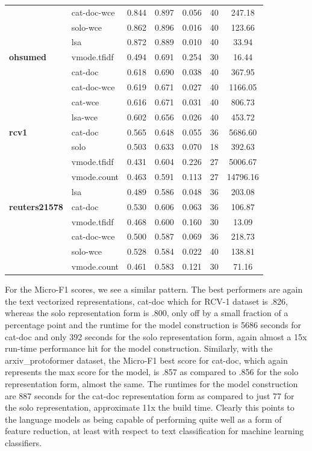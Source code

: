 \documentclass[final]{clv2025}
\begin{document}
\begin{table}[h!]
\begin{tabular}{@{}p{2.2cm} p{2.6cm} c c c c c@{}}
 & cat-doc-wce & 0.844 & 0.897 & 0.056 & 40 & 247.18 \\
 & solo-wce & 0.862 & 0.896 & 0.016 & 40 & 123.66 \\
 & lsa & 0.872 & 0.889 & 0.010 & 40 & 33.94 \\
\midrule
\textbf{ohsumed} & vmode.tfidf & 0.494 & 0.691 & 0.254 & 30 & 16.44 \\
 & cat-doc & 0.618 & 0.690 & 0.038 & 40 & 367.95 \\
 & cat-doc-wce & 0.619 & 0.671 & 0.027 & 40 & 1166.05 \\
 & cat-wce & 0.616 & 0.671 & 0.031 & 40 & 806.73 \\
 & lsa-wce & 0.602 & 0.656 & 0.026 & 40 & 453.72 \\
\midrule
\textbf{rcv1} & cat-doc & 0.565 & 0.648 & 0.055 & 36 & 5686.60 \\
 & solo & 0.503 & 0.633 & 0.070 & 18 & 392.63 \\
 & vmode.tfidf & 0.431 & 0.604 & 0.226 & 27 & 5006.67 \\
 & vmode.count & 0.463 & 0.591 & 0.113 & 27 & 14796.16 \\
 & lsa & 0.489 & 0.586 & 0.048 & 36 & 203.08 \\
\midrule
\textbf{reuters21578} & cat-doc & 0.530 & 0.606 & 0.063 & 36 & 106.87 \\
 & vmode.tfidf & 0.468 & 0.600 & 0.160 & 30 & 13.09 \\
 & cat-doc-wce & 0.500 & 0.587 & 0.069 & 36 & 218.73 \\
 & solo-wce & 0.528 & 0.584 & 0.022 & 40 & 138.81 \\
 & vmode.count & 0.461 & 0.583 & 0.121 & 30 & 71.16 \\
\bottomrule
\end{tabular}
\end{table}

For the Micro-F1 scores, we see a similar pattern. The best performers are again the text vectorized representations, cat-doc which for RCV-1 dataset is .826, whereas the solo representation form is .800, only off by a small fraction of a percentage point and the runtime for the model construction is 5686 seconds for cat-doc and only 392 seconds for the solo representation form, again almost a 15x run-time performance hit for the model construction. Similarly, with the arxiv\_protoformer dataset, the Micro-F1 best score for cat-doc, which again represents the max score for the model, is .857 as compared to .856 for the solo representation form, almost the same. The runtimes for the model construction are 887 seconds for the cat-doc representation form as compared to just 77 for the solo representation, approximate 11x the build time. Clearly this points to the language models as being capable of performing quite well as a form of feature reduction, at least with respect to text classification for machine learning classifiers.
\end{document}
